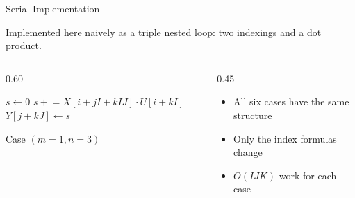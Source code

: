 \documentclass{beamer}
\begin{document}
\begin{frame}[fragile]{Serial Implementation}

Implemented here naively as a triple nested loop: two indexings and a dot product.

\medskip

\begin{columns}[T]
\begin{column}{0.60\textwidth}
\begin{algorithmic}[1]
\small
{}
    \State $s \gets 0$
      \State $s \mathrel{+}= X[i{+}jI{+}kIJ] \cdot U[i{+}kI]$
    \EndFor
    \State $Y[j{+}kJ] \gets s$
  \EndFor
\EndFor
\end{algorithmic}
\vspace{4pt}
\centering\small Case $(m{=}1, n{=}3)$
\end{column}
\begin{column}{0.45\textwidth}
\hspace{-10pt}
\begin{itemize}\small
  \item All six cases have the same structure
  \item Only the index formulas change
  \item $O(IJK)$ work for each case
\end{itemize}
\end{column}
\end{columns}

\end{frame}
\end{document}
